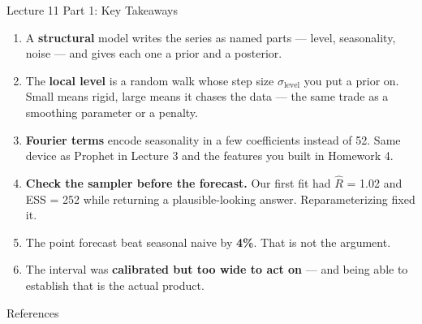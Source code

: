 \documentclass[aspectratio=169, 11pt]{beamer}
\begin{document}
\begin{frame}{Lecture 11 Part 1: Key Takeaways}
  \begin{keybox}
    {\footnotesize
    \begin{enumerate}\itemsep2pt
      \item A \textbf{structural} model writes the series as named parts --- level, seasonality,
            noise --- and gives each one a prior and a posterior.

      \item The \textbf{local level} is a random walk whose step size $\sigma_{\text{level}}$ you
            put a prior on. Small means rigid, large means it chases the data --- the same trade
            as a smoothing parameter or a penalty.

      \item \textbf{Fourier terms} encode seasonality in a few coefficients instead of 52. Same
            device as Prophet in Lecture 3 and the features you built in Homework 4.

      \item \textbf{Check the sampler before the forecast.} Our first fit had $\hat{R}$ = 1.02
            and ESS = 252 while returning a plausible-looking answer. Reparameterizing fixed it.

      \item The point forecast beat seasonal naive by \textbf{4\%}. That is not the argument.

      \item The interval was \textbf{calibrated but too wide to act on} --- and being able to
            establish that is the actual product.
    \end{enumerate}
    }
  \end{keybox}
\end{frame}

\begin{frame}[allowframebreaks]{References}
  \printbibliography[heading=none]
\end{frame}
\end{document}
